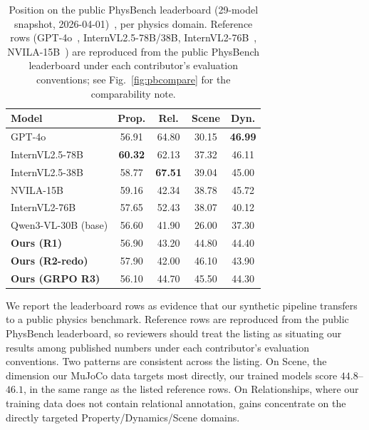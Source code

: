 \documentclass{article}
\begin{document}
\begin{table}[t]
\caption{Position on the public PhysBench leaderboard (29-model
snapshot, 2026-04-01)~\cite{physbench2024}, per physics domain.
Reference rows (GPT-4o~\cite{gpt4o2024}, InternVL2.5-78B/38B,
InternVL2-76B~\cite{internvl2_5}, NVILA-15B~\cite{nvila2024}) are
reproduced from the public PhysBench leaderboard under each
contributor's evaluation conventions; see Fig.~\ref{fig:pbcompare}
for the comparability note.}
\label{tab:leaderboard}
\centering
\footnotesize
\setlength{\tabcolsep}{4pt}
\begin{tabular}{lcccc}
\toprule
Model & Prop. & Rel. & Scene & Dyn. \\
\midrule
GPT-4o                  & 56.91 & 64.80 & 30.15 & \textbf{46.99} \\
InternVL2.5-78B         & \textbf{60.32} & 62.13 & 37.32 & 46.11 \\
InternVL2.5-38B         & 58.77 & \textbf{67.51} & 39.04 & 45.00 \\
NVILA-15B               & 59.16 & 42.34 & 38.78 & 45.72 \\
InternVL2-76B           & 57.65 & 52.43 & 38.07 & 40.12 \\
\midrule
Qwen3-VL-30B (base)     & 56.60 & 41.90 & 26.00 & 37.30 \\
\textbf{Ours (R1)}      & 56.90 & 43.20 & 44.80 & 44.40 \\
\textbf{Ours (R2-redo)} & 57.90 & 42.00 & 46.10 & 43.90 \\
\textbf{Ours (GRPO R3)} & 56.10 & 44.70 & 45.50 & 44.30 \\
\bottomrule
\end{tabular}
\end{table}

We report the leaderboard rows as evidence that our synthetic
pipeline transfers to a public physics benchmark. Reference rows are
reproduced from the public PhysBench leaderboard, so reviewers should
treat the listing as situating our results among published numbers
under each contributor's evaluation conventions. Two patterns are
consistent across the listing. On Scene, the dimension our MuJoCo
data targets most directly, our trained models score $44.8$--$46.1$,
in the same range as the listed reference rows. On Relationships,
where our training data does not contain relational annotation, gains
concentrate on the directly targeted Property/Dynamics/Scene domains.
\end{document}
